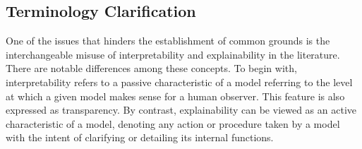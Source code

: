 \documentclass[final]{elsarticle}
\begin{document}
\subsection{Terminology Clarification} \label{sec:terminology}

One of the issues that hinders the establishment of common grounds is the interchangeable misuse of interpretability and explainability in the literature. There are notable differences among these concepts. To begin with, interpretability refers to a passive characteristic of a model referring to the level at which a given model makes sense for a human observer. This feature is also expressed as transparency. By contrast, explainability can be viewed as an active characteristic of a model, denoting any action or procedure taken by a model with the intent of clarifying or detailing its internal functions.
\end{document}
